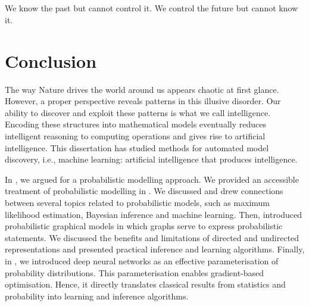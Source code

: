 \thispagestyle{empty}
\section*{}

\vfill

{\centering
\parbox{\textwidth}{%
  \raggedright
  {%

  We know the past but cannot control it. We control the future but cannot know it.\par\bigskip
  }
  \par%
}}

\vfill


\chapter{Conclusion}\label{ch:08}
The way Nature drives the world around us appears chaotic at first glance. However, a proper perspective reveals patterns in this illusive disorder. Our ability to discover and exploit these patterns is what we call intelligence. Encoding these structures into mathematical models eventually reduces intelligent reasoning to computing operations and gives rise to artificial intelligence. This dissertation has studied methods for automated model discovery, i.e., machine learning: artificial intelligence that produces intelligence.

In , we argued for a probabilistic modelling approach. We provided an accessible treatment of probabilistic modelling in . We discussed and drew connections between several topics related to probabilistic models, such as maximum likelihood estimation, Bayesian inference and machine learning. Then,  introduced probabilistic graphical models in which graphs serve to express probabilistic statements. We discussed the benefits and limitations of directed and undirected representations and presented practical inference and learning algorithms. Finally, in , we introduced deep neural networks as an effective parameterisation of probability distributions. This parameterisation enables gradient-based optimisation. Hence, it directly translates classical results from statistics and probability into learning and inference algorithms.

